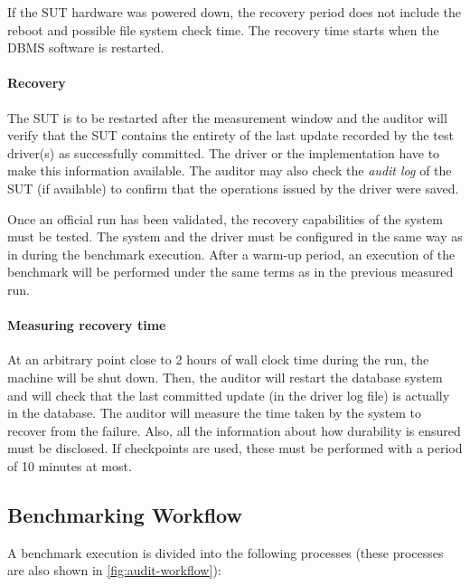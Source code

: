 If the SUT hardware was powered down, the recovery period does not include the reboot and possible file system check time. The recovery time starts when the DBMS software is restarted.




\paragraph{Recovery} 
The SUT is to be restarted after the measurement window and the auditor will verify that the SUT contains the entirety of the last update recorded by the test driver(s) as successfully committed. The driver or the implementation have to make this information available. The auditor may also check the \emph{audit log} of the SUT (if available) to confirm that the operations issued by the driver were saved.

Once an official run has been validated, the recovery capabilities of the system must be tested. The system and the driver must be configured in the same way as in during the benchmark execution. After a warm-up period, an execution of the benchmark will be performed under the same terms as in the previous measured run.

\paragraph{Measuring recovery time}
At an arbitrary point close to 2 hours of wall clock time during the run, the machine will be shut down. Then, the auditor will restart the database system and will check that the last committed update (in the driver log file) is actually in the database. The auditor will measure the time taken by the system to recover from the failure. Also, all the information about how durability is ensured must be disclosed. If checkpoints are used, these must be performed with a period of 10 minutes at most.


\subsection{Benchmarking Workflow}
\label{sec:int-benchmark-workflow}

A benchmark execution is divided into the following processes (these processes are also shown in \autoref{fig:audit-workflow}):

